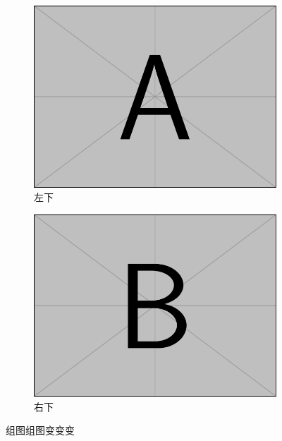 \documentclass[12pt]{ctexart}
\begin{document}
\begin{figure}[!htbp]
	\qquad
	\begin{subfigure}[t]{0.4\textwidth}
		\centering
		\includegraphics[width=\textwidth]{img/example-image-a.pdf}
		\caption{左下}
		\label{}
	\end{subfigure}
	\begin{subfigure}[t]{0.4\textwidth}
		\centering
		\includegraphics[width=\textwidth]{img/example-image-b.pdf}
		\caption{右下}
		\label{}
	\end{subfigure}
	\caption{组图组图变变变}
\end{figure}
\end{document}
